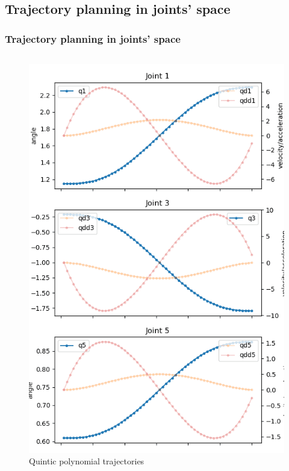 \subsection{Trajectory planning in joints' space}

\begin{frame}
\frametitle{Trajectory planning in joints' space}
\begin{columns}
\begin{center}
\begin{figure}[H]
\centering
\includegraphics[width=\textwidth]{../images/robot_planner3/3e_joint_polynomial_half.png}
\caption{Quintic polynomial trajectories}
\end{figure}
\end{center}


\end{columns}
\end{frame}
